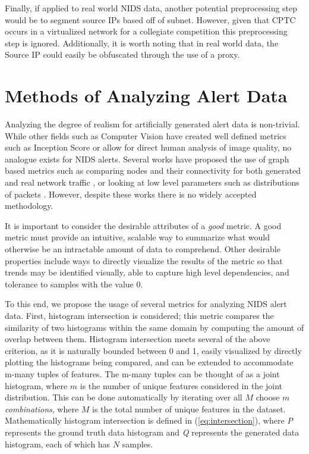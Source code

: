 Finally, if applied to real world NIDS data, another potential preprocessing step would be to segment source IPs based off of subnet. However, given that CPTC occurs in a virtualized network for a collegiate competition this preprocessing step is ignored. Additionally, it is worth noting that in real world data, the Source IP could easily be obfuscated through the use of a proxy. 


\section{Methods of Analyzing Alert Data}
\label{sec:anal}
Analyzing the degree of realism for artificially generated alert data is non-trivial. While other fields such as Computer Vision have created well defined metrics such as Inception Score \cite{Salimans2016} or allow for direct human analysis of image quality, no analogue exists for NIDS alerts. Several works have proposed the use of graph based metrics such as comparing nodes and their connectivity for both generated and real network traffic \cite{Siska2010, Iannucci}, or looking at low level parameters such as distributions of packets \cite{Sommers2004, Botta2012}. However, despite these works there is no widely accepted methodology.

It is important to consider the desirable attributes of a \emph{good} metric. A good metric must provide an intuitive, scalable way to summarize what would otherwise be an intractable amount of data to comprehend. Other desirable properties include ways to directly visualize the results of the metric so that trends may be identified visually, able to capture high level dependencies, and tolerance to samples with the value $0$. 

To this end, we propose the usage of several metrics for analyzing NIDS alert data. First, histogram intersection is considered; this metric compares the similarity of two histograms within the same domain by computing the amount of overlap between them. Histogram intersection meets several of the above criterion, as it is naturally bounded between 0 and 1, easily visualized by directly plotting the histograms being compared, and can be extended to accommodate m-many tuples of features. The m-many tuples can be thought of as a joint histogram, where $m$ is the number of unique features considered in the joint distribution. This can be done automatically by iterating over all $M$ choose $m$ \emph{combinations}, where $M$ is the total number of unique features in the dataset. Mathematically histogram intersection is defined in (\ref{eq:intersection}), where \emph{P} represents the ground truth data histogram and \emph{Q} represents the generated data histogram, each of which has $N$ samples.

